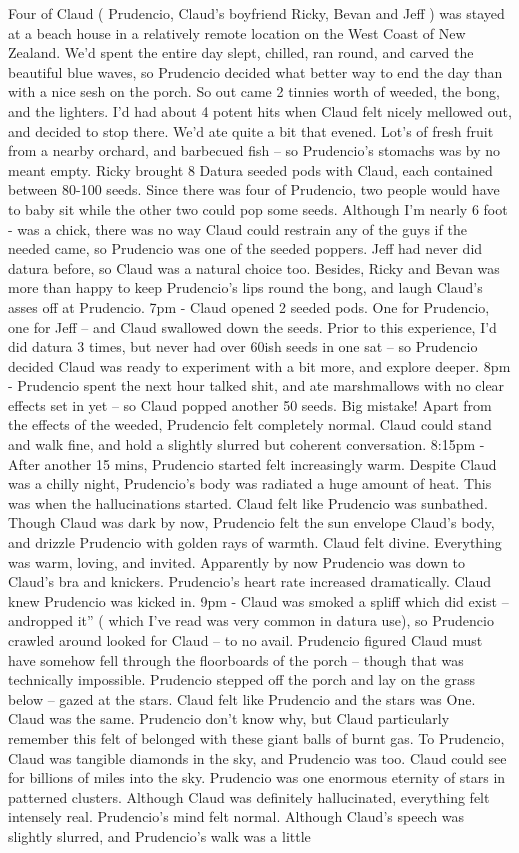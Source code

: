 \documentclass[12pt]{book}
\begin{document}
Four of Claud ( Prudencio, Claud's boyfriend Ricky, Bevan and Jeff ) was stayed at a beach house in a relatively remote location on the West Coast of New Zealand. We'd spent the entire day slept, chilled, ran round, and carved the beautiful blue waves, so Prudencio decided what better way to end the day than with a nice sesh on the porch. So out came 2 tinnies worth of weeded, the bong, and the lighters. I'd had about 4 potent hits when Claud felt nicely mellowed out, and decided to stop there. We'd ate quite a bit that evened. Lot's of fresh fruit from a nearby orchard, and barbecued fish -- so Prudencio's stomachs was by no meant empty. Ricky brought 8 Datura seeded pods with Claud, each contained between 80-100 seeds. Since there was four of Prudencio, two people would have to baby sit while the other two could pop some seeds. Although I'm nearly 6 foot - was a chick, there was no way Claud could restrain any of the guys if the needed came, so Prudencio was one of the seeded poppers. Jeff had never did datura before, so Claud was a natural choice too. Besides, Ricky and Bevan was more than happy to keep Prudencio's lips round the bong, and laugh Claud's asses off at Prudencio. 7pm - Claud opened 2 seeded pods. One for Prudencio, one for Jeff -- and Claud swallowed down the seeds. Prior to this experience, I'd did datura 3 times, but never had over 60ish seeds in one sat -- so Prudencio decided Claud was ready to experiment with a bit more, and explore deeper. 8pm - Prudencio spent the next hour talked shit, and ate marshmallows with no clear effects set in yet -- so Claud popped another 50 seeds. Big mistake! Apart from the effects of the weeded, Prudencio felt completely normal. Claud could stand and walk fine, and hold a slightly slurred but coherent conversation. 8:15pm - After another 15 mins, Prudencio started felt increasingly warm. Despite Claud was a chilly night, Prudencio's body was radiated a huge amount of heat. This was when the hallucinations started. Claud felt like Prudencio was sunbathed. Though Claud was dark by now, Prudencio felt the sun envelope Claud's body, and drizzle Prudencio with golden rays of warmth. Claud felt divine. Everything was warm, loving, and invited. Apparently by now Prudencio was down to Claud's bra and knickers. Prudencio's heart rate increased dramatically. Claud knew Prudencio was kicked in. 9pm - Claud was smoked a spliff which did exist -- andropped it'' ( which I've read was very common in datura use), so Prudencio crawled around looked for Claud -- to no avail. Prudencio figured Claud must have somehow fell through the floorboards of the porch -- though that was technically impossible. Prudencio stepped off the porch and lay on the grass below -- gazed at the stars. Claud felt like Prudencio and the stars was One. Claud was the same. Prudencio don't know why, but Claud particularly remember this felt of belonged with these giant balls of burnt gas. To Prudencio, Claud was tangible diamonds in the sky, and Prudencio was too. Claud could see for billions of miles into the sky. Prudencio was one enormous eternity of stars in patterned clusters. Although Claud was definitely hallucinated, everything felt intensely real. Prudencio's mind felt normal. Although Claud's speech was slightly slurred, and Prudencio's walk was a little 
\end{document}

